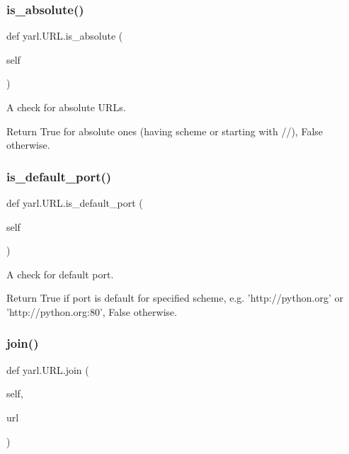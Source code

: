 \subsubsection{\texorpdfstring{is\+\_\+absolute()}{is\_absolute()}}
{\footnotesize\ttfamily def yarl.\+U\+R\+L.\+is\+\_\+absolute (\begin{DoxyParamCaption}\item[{}]{self }\end{DoxyParamCaption})}

\begin{DoxyVerb}A check for absolute URLs.

Return True for absolute ones (having scheme or starting
with //), False otherwise.\end{DoxyVerb}
 \mbox{\label{classyarl_1_1_u_r_l_ad23e2c5fa74000816d6f2aa0fe069f13}} 
\subsubsection{\texorpdfstring{is\+\_\+default\+\_\+port()}{is\_default\_port()}}
{\footnotesize\ttfamily def yarl.\+U\+R\+L.\+is\+\_\+default\+\_\+port (\begin{DoxyParamCaption}\item[{}]{self }\end{DoxyParamCaption})}

\begin{DoxyVerb}A check for default port.

Return True if port is default for specified scheme,
e.g. 'http://python.org' or 'http://python.org:80', False
otherwise.\end{DoxyVerb}
 \mbox{\label{classyarl_1_1_u_r_l_a6a8621c960edb357557a46b772225928}} 
\subsubsection{\texorpdfstring{join()}{join()}}
{\footnotesize\ttfamily def yarl.\+U\+R\+L.\+join (\begin{DoxyParamCaption}\item[{}]{self,  }\item[{}]{url }\end{DoxyParamCaption})}

